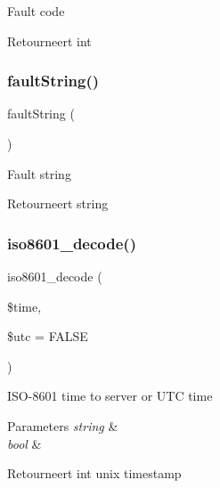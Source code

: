 Fault code

\begin{DoxyReturn}{Retourneert}
int 
\end{DoxyReturn}
\mbox{\label{class_x_m_l___r_p_c___response_a2f922009ed0801616d3df198a48d193b}} 
\subsubsection{\texorpdfstring{faultString()}{faultString()}}
{\footnotesize\ttfamily fault\+String (\begin{DoxyParamCaption}{ }\end{DoxyParamCaption})}

Fault string

\begin{DoxyReturn}{Retourneert}
string 
\end{DoxyReturn}
\mbox{\label{class_x_m_l___r_p_c___response_afd1f70f703eb82303e1199e8653c9c44}} 
\subsubsection{\texorpdfstring{iso8601\_decode()}{iso8601\_decode()}}
{\footnotesize\ttfamily iso8601\+\_\+decode (\begin{DoxyParamCaption}\item[{}]{\$time,  }\item[{}]{\$utc = {\ttfamily FALSE} }\end{DoxyParamCaption})}

I\+S\+O-\/8601 time to server or U\+TC time


\begin{DoxyParams}{Parameters}
{\em string} & \\
\hline
{\em bool} & \\
\hline
\end{DoxyParams}
\begin{DoxyReturn}{Retourneert}
int unix timestamp 
\end{DoxyReturn}
\mbox{\label{class_x_m_l___r_p_c___response_ac6925a06291928e6d4e8e53ea10fb1e2}} 
